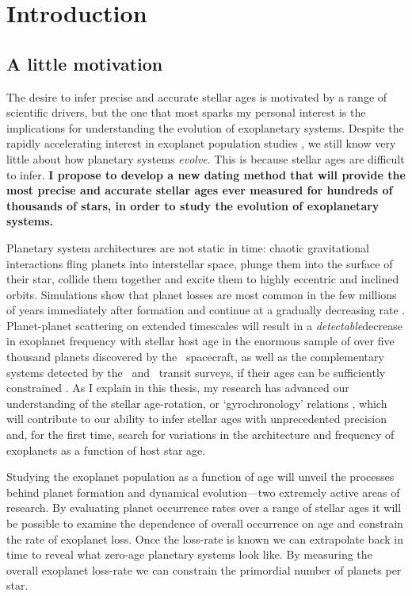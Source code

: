 \chapter{Introduction}
\section{A little motivation}

The desire to infer precise and accurate stellar ages is motivated by a range
of scientific drivers, but the one that most sparks my personal interest is
the implications for understanding the evolution of exoplanetary systems.
Despite the rapidly accelerating interest in exoplanet population studies
\citep[e.g.][]{petigura, dressing, foreman-mackey, burke}, we still know very
little about how planetary systems {\it evolve}.
This is because stellar ages are difficult to infer.
{\bf I propose to develop a new dating method that will provide the most
precise and accurate stellar ages ever measured for hundreds of thousands of
stars, in order to study the evolution of exoplanetary systems.}

Planetary system architectures are not static in time: chaotic gravitational
interactions fling planets into interstellar space, plunge them into the
surface of their star, collide them together and excite them to highly
eccentric and inclined orbits.
Simulations show that planet losses are most common in the few millions of
years immediately after formation and continue at a gradually decreasing rate
\citep[e.g.][]{zhou, smith, funk, Pu2015}.
Planet-planet scattering on extended timescales will result in a {\it
detectable}\/decrease in exoplanet frequency with stellar host age in the
enormous sample of over five thousand planets discovered by the \Kepler\
spacecraft, as well as the complementary systems detected by the \Ktwo\ and
\TESS\ transit surveys, if their ages can be sufficiently constrained
\citep{veras}.
As I explain in this thesis, my research has advanced our understanding of the
stellar age-rotation, or `gyrochronology' relations \citep{angus}, which will
contribute to our ability to infer stellar ages with unprecedented precision
and, for the first time, search for variations in the architecture and
frequency of exoplanets as a function of host star age.

Studying the exoplanet population as a function of age will unveil the
processes behind planet formation and dynamical evolution---two extremely
active areas of research.
By evaluating planet occurrence rates over a range of stellar ages it will be
possible to examine the dependence of overall occurrence on age and constrain
the rate of exoplanet loss.
Once the loss-rate is known we can extrapolate back in time to reveal what
zero-age planetary systems look like.
By measuring the overall exoplanet loss-rate we can constrain the primordial
number of planets per star.

